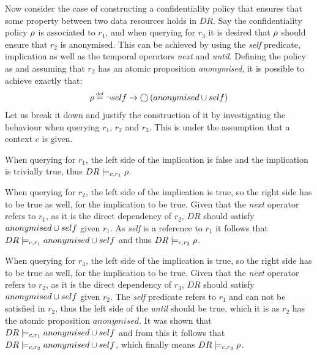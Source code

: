 \begin{example}
Now consider the case of constructing a confidentiality policy that ensures that some property between two data resources holds in $DR$. Say the confidentiality policy $\rho$ is associated to $r_1$, and when querying for $r_3$ it is desired that $\rho$ should ensure that $r_2$ is anonymised. This can be achieved by using the \emph{self} predicate, implication as well as the temporal operators \emph{next} and \emph{until}. Defining the policy as and assuming that $r_2$ has an atomic proposition \emph{anonymised}, it is possible to achieve exactly that:
\begin{align*}
    \conf \eqdef \lnot self \imply \X \left( anonymised \U self \right)
\end{align*}
Let us break it down and justify the construction of it by investigating the behaviour when querying $r_1$, $r_2$ and $r_3$. This is under the assumption that a context $c$ is given.

When querying for $r_1$, the left side of the implication is false and the implication is trivially true, thus $DR \models_{c,r_1} \rho$. 

When querying for $r_2$, the left side of the implication is true, so the right side has to be true as well, for the implication to be true. Given that the \emph{next} operator refers to $r_1$, as it is the direct dependency of $r_2$, $DR$ should satisfy $anonymised \cup self$ given $r_1$. As \emph{self} is a reference to $r_1$ it follows that $DR \models_{c,r_1} anonymised \cup self$ and thus $DR \models_{c,r_2} \rho$.

When querying for $r_3$, the left side of the implication is true, so the right side has to be true as well, for the implication to be true. Given that the \emph{next} operator refers to $r_2$, as it is the direct dependency of $r_3$, $DR$ should satisfy $anonymised \cup self$ given $r_2$. The \emph{self} predicate refers to $r_1$ and can not be satisfied in $r_2$, thus the left side of the \emph{until} should be true, which it is as $r_2$ has the atomic proposition $anonymised$. It was shown that $DR \models_{c,r_1} anonymised \cup self$ and from this it follows that $DR \models_{c,r_2} anonymised \cup self$, which finally means $DR \models_{c,r_3} \rho$.
\end{example}

